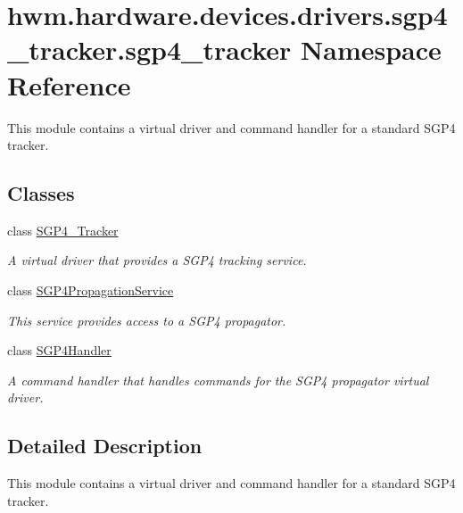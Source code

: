 \hypertarget{namespacehwm_1_1hardware_1_1devices_1_1drivers_1_1sgp4__tracker_1_1sgp4__tracker}{\section{hwm.\-hardware.\-devices.\-drivers.\-sgp4\-\_\-tracker.\-sgp4\-\_\-tracker Namespace Reference}
\label{namespacehwm_1_1hardware_1_1devices_1_1drivers_1_1sgp4__tracker_1_1sgp4__tracker}
}


This module contains a virtual driver and command handler for a standard S\-G\-P4 tracker.  


\subsection*{Classes}
\begin{DoxyCompactItemize}
\item 
class \hyperlink{classhwm_1_1hardware_1_1devices_1_1drivers_1_1sgp4__tracker_1_1sgp4__tracker_1_1_s_g_p4___tracker}{S\-G\-P4\-\_\-\-Tracker}
\begin{DoxyCompactList}\small\item\em A virtual driver that provides a S\-G\-P4 tracking service. \end{DoxyCompactList}\item 
class \hyperlink{classhwm_1_1hardware_1_1devices_1_1drivers_1_1sgp4__tracker_1_1sgp4__tracker_1_1_s_g_p4_propagation_service}{S\-G\-P4\-Propagation\-Service}
\begin{DoxyCompactList}\small\item\em This service provides access to a S\-G\-P4 propagator. \end{DoxyCompactList}\item 
class \hyperlink{classhwm_1_1hardware_1_1devices_1_1drivers_1_1sgp4__tracker_1_1sgp4__tracker_1_1_s_g_p4_handler}{S\-G\-P4\-Handler}
\begin{DoxyCompactList}\small\item\em A command handler that handles commands for the S\-G\-P4 propagator virtual driver. \end{DoxyCompactList}\end{DoxyCompactItemize}


\subsection{Detailed Description}
This module contains a virtual driver and command handler for a standard S\-G\-P4 tracker. 